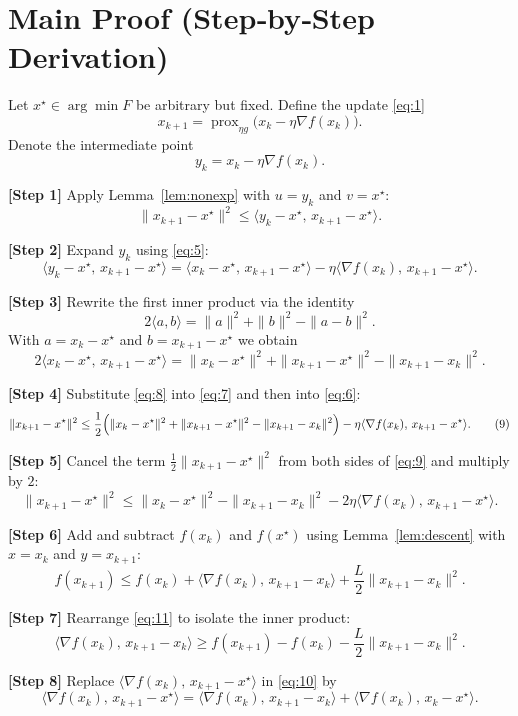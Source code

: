 \documentclass{article}
\newcommand{\prox}{\operatorname{prox}}
\begin{document}
\section*{Main Proof (Step‑by‑Step Derivation)}
Let $x^{\star}\in\arg\min F$ be arbitrary but fixed.  Define the update \eqref{eq:1}
\[
x_{k+1}= \prox_{\eta g}\bigl(x_{k}-\eta\nabla f(x_{k})\bigr).
\]
Denote the intermediate point
\[
y_{k}=x_{k}-\eta\nabla f(x_{k}).
\tag{5}
\]

\noindent\textbf{[Step 1]} Apply Lemma~\ref{lem:nonexp} with $u=y_{k}$ and $v=x^{\star}$:
\[
\|x_{k+1}-x^{\star}\|^{2}
\le \langle y_{k}-x^{\star},\,x_{k+1}-x^{\star}\rangle .
\tag{6}
\]

\noindent\textbf{[Step 2]} Expand $y_{k}$ using \eqref{eq:5}:
\[
\langle y_{k}-x^{\star},\,x_{k+1}-x^{\star}\rangle
=\langle x_{k}-x^{\star},\,x_{k+1}-x^{\star}\rangle
-\eta\langle\nabla f(x_{k}),\,x_{k+1}-x^{\star}\rangle .
\tag{7}
\]

\noindent\textbf{[Step 3]} Rewrite the first inner product via the identity
\[
2\langle a,b\rangle=\|a\|^{2}+\|b\|^{2}-\|a-b\|^{2}.
\]
With $a=x_{k}-x^{\star}$ and $b=x_{k+1}-x^{\star}$ we obtain
\[
2\langle x_{k}-x^{\star},\,x_{k+1}-x^{\star}\rangle
= \|x_{k}-x^{\star}\|^{2}+\|x_{k+1}-x^{\star}\|^{2}
-\|x_{k+1}-x_{k}\|^{2}.
\tag{8}
\]

\noindent\textbf{[Step 4]} Substitute \eqref{eq:8} into \eqref{eq:7} and then into \eqref{eq:6}:
\[
\|x_{k+1}-x^{\star}\|^{2}
\le\frac12\Bigl(\|x_{k}-x^{\star}\|^{2}+\|x_{k+1}-x^{\star}\|^{2}
-\|x_{k+1}-x_{k}\|^{2}\Bigr)
-\eta\langle\nabla f(x_{k}),\,x_{k+1}-x^{\star}\rangle .
\tag{9}
\]

\noindent\textbf{[Step 5]} Cancel the term $\frac12\|x_{k+1}-x^{\star}\|^{2}$ from both sides of \eqref{eq:9} and multiply by $2$:
\[
\|x_{k+1}-x^{\star}\|^{2}
\le \|x_{k}-x^{\star}\|^{2}
-\|x_{k+1}-x_{k}\|^{2}
-2\eta\langle\nabla f(x_{k}),\,x_{k+1}-x^{\star}\rangle .
\tag{10}
\]

\noindent\textbf{[Step 6]} Add and subtract $f(x_{k})$ and $f(x^{\star})$ using Lemma~\ref{lem:descent} with $x=x_{k}$ and $y=x_{k+1}$:
\[
f(x_{k+1})\le f(x_{k})+\langle\nabla f(x_{k}),\,x_{k+1}-x_{k}\rangle
+\frac{L}{2}\|x_{k+1}-x_{k}\|^{2}.
\tag{11}
\]

\noindent\textbf{[Step 7]} Rearrange \eqref{eq:11} to isolate the inner product:
\[
\langle\nabla f(x_{k}),\,x_{k+1}-x_{k}\rangle
\ge f(x_{k+1})-f(x_{k})-\frac{L}{2}\|x_{k+1}-x_{k}\|^{2}.
\tag{12}
\]

\noindent\textbf{[Step 8]} Replace $\langle\nabla f(x_{k}),\,x_{k+1}-x^{\star}\rangle$ in \eqref{eq:10} by
\[
\langle\nabla f(x_{k}),\,x_{k+1}-x^{\star}\rangle
= \langle\nabla f(x_{k}),\,x_{k+1}-x_{k}\rangle
+ \langle\nabla f(x_{k}),\,x_{k}-x^{\star}\rangle .
\tag{13}
\]
\end{document}
